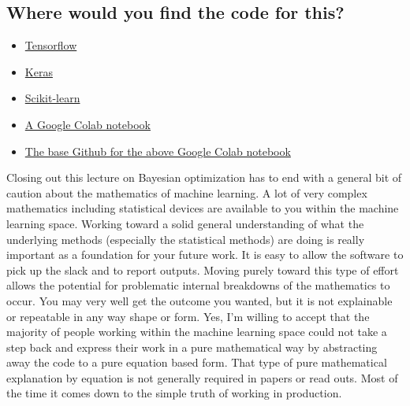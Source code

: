 \documentclass{article}
\begin{document}
\subsection{Where would you find the code for this?}
\begin{itemize}
\item \href{https://blog.tensorflow.org/2020/01/hyperparameter-tuning-with-keras-tuner.html}{Tensorflow}
\item \href{https://github.com/keras-team/keras-tuner}{Keras}
\item \href{https://scikit-optimize.github.io/stable/}{Scikit-learn}
\item \href{https://colab.research.google.com/github/krasserm/bayesian-machine-learning/blob/master/bayesian_optimization.ipynb}{A Google Colab notebook}
\item \href{https://github.com/krasserm/}{The base Github for the above Google Colab notebook}
\end{itemize}
Closing out this lecture on Bayesian optimization has to end with a general bit of caution about the mathematics of machine learning. A lot of very complex mathematics including statistical devices are available to you within the machine learning space. Working toward a solid general understanding of what the underlying methods (especially the statistical methods) are doing is really important as a foundation for your future work. It is easy to allow the software to pick up the slack and to report outputs. Moving purely toward this type of effort allows the potential for problematic internal breakdowns of the mathematics to occur. You may very well get the outcome you wanted, but it is not explainable or repeatable in any way shape or form. Yes, I’m willing to accept that the majority of people working within the machine learning space could not take a step back and express their work in a pure mathematical way by abstracting away the code to a pure equation based form. That type of pure mathematical explanation by equation is not generally required in papers or read outs. Most of the time it comes down to the simple truth of working in production. 
\end{document}
